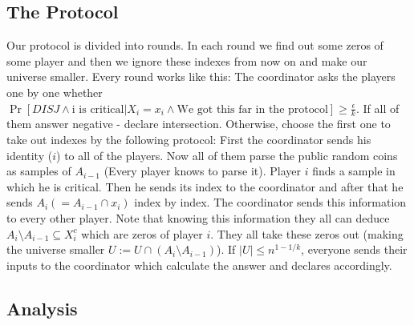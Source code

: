 \documentclass{article}
\begin{document}
\subsection{The Protocol}
Our protocol is divided into rounds. In each round we find out some zeros of some player and then we ignore these indexes from now on and make our universe smaller. \newline
Every round works like this: \newline
The coordinator asks the players one by one whether $\Pr[DISJ \land \text{i is critical} | X_i = x_i \land \text{We got this far in the protocol}] \geq \frac{\epsilon}{k}$. \newline
If all of them answer negative - declare intersection. \newline
Otherwise, choose the first one to take out indexes by the following protocol: \newline
First the coordinator sends his identity ($i$) to all of the players. \newline
Now all of them parse the public random coins as samples of $A_{i-1}$ (Every player knows to parse it). Player $i$ finds a sample in which he is critical. Then he sends its index to the coordinator and after that he sends $A_i (=A_{i-1} \cap x_i)$ index by index. The coordinator sends this information to every other player.
Note that knowing this information they all can deduce $A_i \setminus A_{i-1} \subseteq X^{c}_i$ which are zeros of player $i$. They all take these zeros out (making the universe smaller $U := U \cap (A_i \setminus A_{i-1})$). If $|U| \leq n^{1-1/k}$, everyone sends their inputs to the coordinator which calculate the answer and declares accordingly.
\subsection{Analysis}
\end{document}

